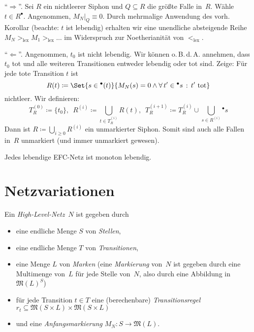 \documentclass{cheat-sheet}
\newcommand{\preset}[1]{{}^\bullet{#1}} %
\newcommand{\postset}[1]{{#1}^\bullet} %
\newcommand{\Multisets}{\mathfrak{M}} %
\begin{document}
\begin{beweis}
  "`$\Rightarrow$"'.
  Sei $R$ ein nichtleerer Siphon und $Q \subseteq R$ die größte Falle in~$R$.
  Wähle $t \in \postset{R}$.
  Angenommen, $M_N|_Q \equiv 0$.
  Durch mehrmalige Anwendung des vorh. Korollar (beachte: $t$ ist lebendig) erhalten wir eine unendliche absteigende Reihe $M_N >_\mathrm{lex} M_1 >_\mathrm{lex} \ldots$ im Widerspruch zur Noetherianität von ${<_\mathrm{lex}}$.
  
  "`$\Leftarrow$"'.
  Angenommen, $t_0$ ist nicht lebendig.
  Wir können o.\,B.\,d.\,A. annehmen, dass $t_0$ tot und alle weiteren Transitionen entweder lebendig oder tot sind.
  Zeige: Für jede tote Transition $t$ ist
  \[
    R(t) \coloneqq \Set{s \in \preset(t)}{M_N(s) = 0 \wedge \fa{t' \in \preset{s}} t' \text{ tot}}
  \]
  nichtleer.
  Wir definieren:
  \[
    T_R^{(0)} \coloneqq \{ t_0 \}, \enspace
    R^{(i)} \coloneqq {\bigcup}_{t \in T_R^{(i)}} R(t), \enspace
    T_R^{(i+1)} \coloneqq T_R^{(i)} \cup {\bigcup}_{s \in R^{(i)}} \preset{s}
  \]
  Dann ist $R \coloneqq {\bigcup}_{i \geq 0} R^{(i)}$ ein unmarkierter Siphon.
  Somit sind auch alle Fallen in~$R$ unmarkiert (und immer unmarkiert gewesen).
\end{beweis}

\begin{samepage}

\begin{kor}
  Jedes lebendige EFC-Netz ist monoton lebendig.
\end{kor}

\section{Netzvariationen}

\end{samepage}


\begin{defn}
  Ein \emph{High-Level-Netz}~$N$ ist gegeben durch
  \begin{itemize}
    \item eine endliche Menge $S$ von \textit{Stellen},
    \item eine endliche Menge $T$ von \textit{Transitionen},
    \item eine Menge $L$ von \textit{Marken} (eine \textit{Markierung} von~$N$ ist gegeben durch eine Multimenge von~$L$ für jede Stelle von~$N$, also durch eine Abbildung in $\Multisets(L)^S$)
    \item für jede Transition $t \in T$ eine (berechenbare) \textit{Transitionsregel} $r_t \subseteq \Multisets(S \times L) \times \Multisets(S \times L)$
    \item und eine \textit{Anfangsmarkierung} $M_N : S \to \Multisets(L)$.
  \end{itemize}
\end{defn}
\end{document}
